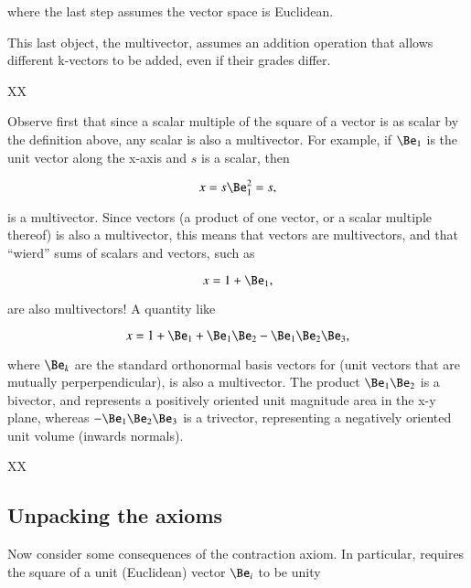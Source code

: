 where the last step assumes the vector space is Euclidean.



This last object, the multivector, assumes an addition operation that allows different k-vectors to be added, even if their grades differ.

XX

Observe first that since a scalar multiple of the square of a vector is as scalar by the definition above,
any scalar is also a multivector.
For example, if \( \Be_1 \) is the unit vector along the x-axis and \( s \) is a scalar, then

\begin{equation}\label{eqn:multivector:20}
   x = s \Be_1^2 = s,
\end{equation}

is a multivector.
Since vectors (a product of one vector, or a scalar multiple thereof) is also a multivector, this
means that vectors are multivectors, and that ``wierd'' sums of scalars and vectors, such as

\begin{dmath}\label{eqn:multivector:40}
   x = 1 + \Be_1,
\end{dmath}

are also multivectors!  A quantity like

\begin{dmath}\label{eqn:multivector:45}
   x = 1 + \Be_1 + \Be_1 \Be_2 - \Be_1 \Be_2 \Be_3,
\end{dmath}

where \( \Be_k \) are the standard orthonormal basis vectors for  (unit vectors that are mutually perperpendicular), is also a multivector.
The product \( \Be_1 \Be_2 \) is a bivector, and represents a positively oriented unit magnitude area in the x-y plane, whereas \( - \Be_1 \Be_2 \Be_3 \) is a trivector, representing a negatively oriented unit volume (inwards normals).

XX
\subsection{Unpacking the axioms}
Now consider some consequences of the contraction axiom.
In particular,
requires the square of a unit (Euclidean) vector \( \Be_i \) to be unity


